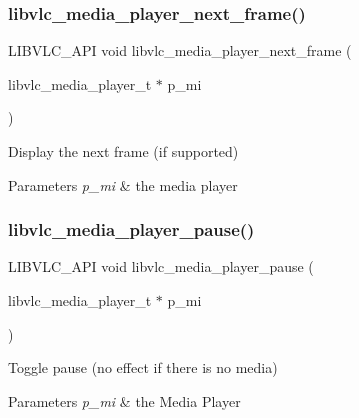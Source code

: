 \subsubsection{\texorpdfstring{libvlc\+\_\+media\+\_\+player\+\_\+next\+\_\+frame()}{libvlc\_media\_player\_next\_frame()}}
{\footnotesize\ttfamily L\+I\+B\+V\+L\+C\+\_\+\+A\+PI void libvlc\+\_\+media\+\_\+player\+\_\+next\+\_\+frame (\begin{DoxyParamCaption}\item[{libvlc\+\_\+media\+\_\+player\+\_\+t $\ast$}]{p\+\_\+mi }\end{DoxyParamCaption})}

Display the next frame (if supported)


\begin{DoxyParams}{Parameters}
{\em p\+\_\+mi} & the media player \\
\hline
\end{DoxyParams}
\mbox{\label{group__libvlc__media__player_ga61712d4eb8f63232c712a81fb19ee8fa}} 
\subsubsection{\texorpdfstring{libvlc\+\_\+media\+\_\+player\+\_\+pause()}{libvlc\_media\_player\_pause()}}
{\footnotesize\ttfamily L\+I\+B\+V\+L\+C\+\_\+\+A\+PI void libvlc\+\_\+media\+\_\+player\+\_\+pause (\begin{DoxyParamCaption}\item[{libvlc\+\_\+media\+\_\+player\+\_\+t $\ast$}]{p\+\_\+mi }\end{DoxyParamCaption})}

Toggle pause (no effect if there is no media)


\begin{DoxyParams}{Parameters}
{\em p\+\_\+mi} & the Media Player \\
\hline
\end{DoxyParams}
\mbox{\label{group__libvlc__media__player_gac5da60e52d11c81c7a6a61f470aa1646}} 

